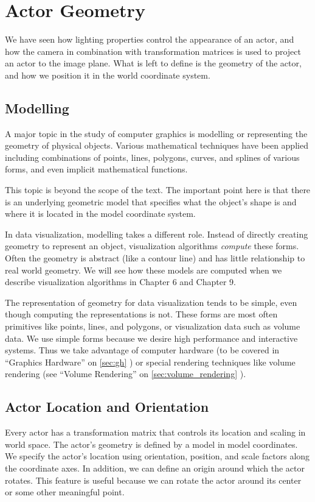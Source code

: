 \section{Actor Geometry}
We have seen how lighting properties control the appearance of an actor, and how the camera in combination with transformation matrices is used to project an actor to the image plane. What is left to define is the geometry of the actor, and how we position it in the world coordinate system.

\subsection{Modelling}
A major topic in the study of computer graphics is modelling or representing the geometry of physical objects. Various mathematical techniques have been applied including combinations of points, lines, polygons, curves, and splines of various forms, and even implicit mathematical functions.

This topic is beyond the scope of the text. The important point here is that there is an underlying geometric model that specifies what the object's shape is and where it is located in the model coordinate system.

In data visualization, modelling takes a different role. Instead of directly creating geometry to represent an object, visualization algorithms \emph{compute} these forms. Often the geometry is abstract (like a contour line) and has little relationship to real world geometry. We will see how these models are computed when we describe visualization algorithms in Chapter 6 and Chapter 9.

The representation of geometry for data visualization tends to be simple, even though computing the representations is not. These forms are most often primitives like points, lines, and polygons, or visualization data such as volume data. We use simple forms because we desire high performance and interactive systems. Thus we take advantage of computer hardware (to be covered in ``Graphics Hardware'' on \ref{sec:gh} ) or special rendering techniques like volume rendering (see ``Volume Rendering'' on \ref{sec:volume_rendering} ).

\subsection{Actor Location and Orientation}

Every actor has a transformation matrix that controls its location and scaling in world space. The actor's geometry is defined by a model in model coordinates. We specify the actor's location using orientation, position, and scale factors along the coordinate axes. In addition, we can define an origin around which the actor rotates. This feature is useful because we can rotate the actor around its center or some other meaningful point.

